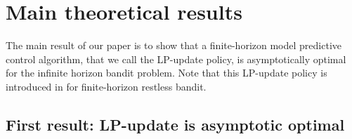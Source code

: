 \section{Main theoretical results}
\label{sec:main-theory}

The main result of our paper is to show that a finite-horizon model predictive control algorithm, that we call the LP-update policy, is asymptotically optimal for the infinite horizon bandit problem. Note that this LP-update policy is introduced in \citet{GGY23,GGY23b,ghosh2022indexability} for finite-horizon restless bandit.



\subsection{First result: LP-update is asymptotic optimal}

